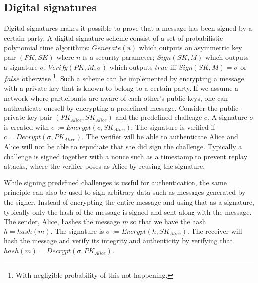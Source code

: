 \subsection{Digital signatures}

Digital signatures makes it possible to prove that a message has been signed by a certain party. A digital signature scheme consist of a set of probabilistic polynomial time algorithms: $Generate(n)$ which outputs an asymmetric key pair $(PK, SK)$ where $n$ is a security parameter; $Sign(SK, M)$ which outputs a signature $\sigma$; $Verify(PK, M, \sigma)$ which outputs $true$ iff $Sign(SK, M) = \sigma$ or $false$ otherwise \footnote{With negligible probability of this not happening.}. Such a scheme can be implemented by encrypting a message with a private key that is known to belong to a certain party. If we assume a network where participants are aware of each other's public keys, one can authenticate oneself by encrypting a predefined message. Consider the public-private key pair $(PK_{Alice}, SK_{Alice})$ and the predefined challenge $c$. A signature $\sigma$ is created with $\sigma := Encrypt(c, SK_{Alice})$. The signature is verified if $c=Decrypt(\sigma, PK_{Alice})$. The verifier will be able to authenticate Alice and Alice will not be able to repudiate that she did sign the challenge. Typically a challenge is signed together with a nonce such as a timestamp to prevent replay attacks, where the verifier poses as Alice by reusing the signature.

While signing predefined challenges is useful for authentication, the same principle can also be used to sign arbitrary data such as messages generated by the signer. Instead of encrypting the entire message and using that as a signature, typically only the hash of the message is signed and sent along with the message. The sender, Alice, hashes the message $m$ so that we have the hash $h=hash(m)$. The signature is $\sigma := Encrypt(h, SK_{Alice})$. The receiver will hash the message and verify its integrity and authenticity by verifying that $hash(m)=Decrypt(\sigma, PK_{Alice})$.
